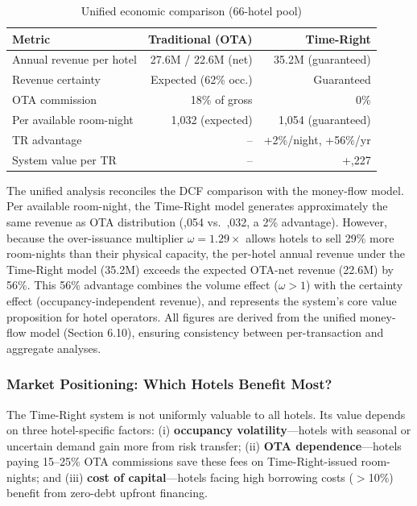 \documentclass[12pt,a4paper]{article}
\begin{document}
\begin{table}[H]
\centering
\caption{Unified economic comparison (66-hotel pool)}
\label{tab:comparison}
\small
\begin{tabular}{@{}lrr@{}}
\toprule
\textbf{Metric} & \textbf{Traditional (OTA)} & \textbf{Time-Right} \\
\midrule
Annual revenue per hotel & 27.6M / 22.6M (net) & 35.2M (guaranteed) \\
Revenue certainty & Expected (62\% occ.) & Guaranteed \\
OTA commission & 18\% of gross & 0\% \\
Per available room-night & 1,032 (expected) & 1,054 (guaranteed) \\
TR advantage & -- & +2\%/night, +56\%/yr \\
System value per TR & -- & +\yen 1,227 \\
\bottomrule
\end{tabular}
\end{table}

The unified analysis reconciles the DCF comparison with the money-flow model.
Per available room-night, the Time-Right model generates approximately the same revenue as OTA distribution (,054 vs.\ ,032, a 2\% advantage).
However, because the over-issuance multiplier $\omega = 1.29\times$ allows hotels to sell 29\% more room-nights than their physical capacity, the per-hotel annual revenue under the Time-Right model (\yen 35.2M) exceeds the expected OTA-net revenue (\yen 22.6M) by 56\%.
This 56\% advantage combines the volume effect ($\omega > 1$) with the certainty effect (occupancy-independent revenue), and represents the system's core value proposition for hotel operators.
All figures are derived from the unified money-flow model (Section 6.10), ensuring consistency between per-transaction and aggregate analyses.

\subsubsection{Market Positioning: Which Hotels Benefit Most?}

The Time-Right system is not uniformly valuable to all hotels.
Its value depends on three hotel-specific factors: (i) \textbf{occupancy volatility}---hotels with seasonal or uncertain demand gain more from risk transfer; (ii) \textbf{OTA dependence}---hotels paying 15--25\% OTA commissions save these fees on Time-Right-issued room-nights; and (iii) \textbf{cost of capital}---hotels facing high borrowing costs ($>$10\%) benefit from zero-debt upfront financing.
\end{document}
